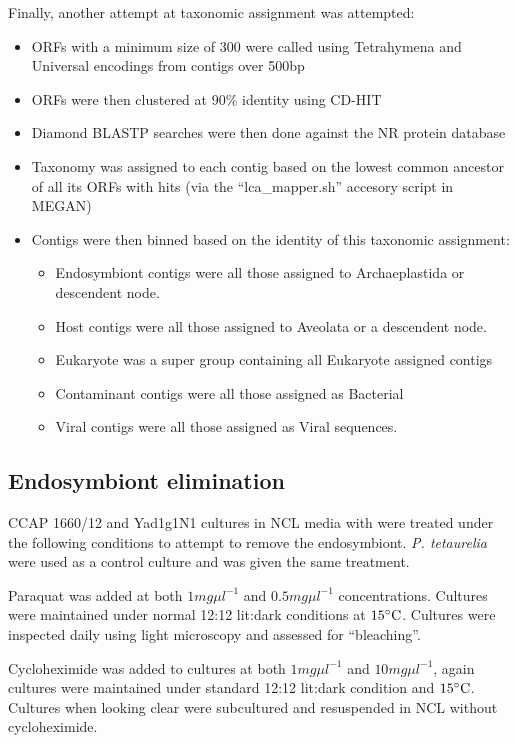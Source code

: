 Finally, another attempt at taxonomic assignment was attempted:
\begin{itemize}
    \item ORFs with a minimum size of 300 were called using Tetrahymena and Universal encodings from contigs over 500bp 
    \item ORFs were then clustered at 90\% identity using CD-HIT
    \item Diamond BLASTP searches were then done against the NR protein database
    \item Taxonomy was assigned to each contig based on the lowest common ancestor of all its
        ORFs with hits (via the ``lca\_mapper.sh'' accesory script in MEGAN)
    \item Contigs were then binned based on the identity of this taxonomic assignment:
        \begin{itemize}
            \item Endosymbiont contigs were all those assigned to Archaeplastida or descendent node.
            \item Host contigs were all those assigned to Aveolata or a descendent node.
            \item Eukaryote was a super group containing all Eukaryote assigned contigs
            \item Contaminant contigs were all those assigned as Bacterial
            \item Viral contigs were all those assigned as Viral sequences. 
        \end{itemize}
\end{itemize}

\subsection{Endosymbiont elimination}

CCAP 1660/12 and Yad1g1N1 cultures in NCL media with were treated under the following
conditions to attempt to remove the endosymbiont. 
\textit{P. tetaurelia} were used as a control culture and was
given the same treatment. 

Paraquat was added at both \(1mg\mu l^{-1}\) and
\(0.5mg\mu l^{-1}\) concentrations.
Cultures were maintained under normal 12:12 lit:dark 
conditions at \(15\celsius\).  Cultures were inspected
daily using light microscopy and assessed for ``bleaching''.

Cycloheximide was added to cultures at both \(1mg\mu l^{-1}\)
and \(10mg\mu l^{-1}\), again cultures were maintained under
standard 12:12 lit:dark condition and \(15\celsius\). 
Cultures when looking clear were subcultured and resuspended in 
NCL without cycloheximide.

